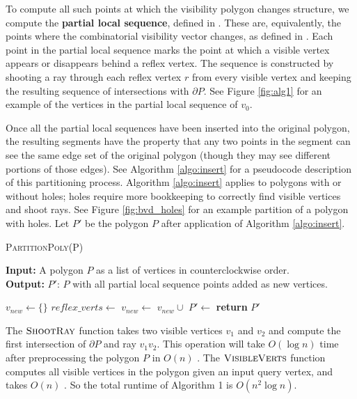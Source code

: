 \documentclass[sageh,times,Review]{sagej}
\begin{document}
To compute all such points at which the visibility polygon changes structure, we
 compute the \textbf{partial local sequence}, defined in \cite{rourke_viz}.
These are, equivalently, the points where the combinatorial visibility vector
changes, as defined in \cite{suri2008simple}.
Each point in the partial local sequence marks the point
at which a visible vertex appears or disappears behind a reflex vertex. 
The sequence is constructed by shooting a ray through each reflex vertex $r$ from every
visible vertex and keeping the resulting sequence of intersections with
$\partial P$. See Figure \ref{fig:alg1} for an
example of the vertices in the partial local sequence of $v_0$. 

Once all the partial local sequences have been inserted into the original
polygon, the resulting segments have the property that 
any two points in the segment can see the same edge set of the
original polygon (though they may see different portions of those edges).
See Algorithm \ref{algo:insert} for a pseudocode
description of this partitioning process. Algorithm
\ref{algo:insert} applies to polygons with or without holes; holes 
require more bookkeeping to correctly find visible vertices and shoot
rays. See Figure \ref{fig:bvd_holes} for an example partition of a polygon with
 holes. Let $P'$ be the polygon $P$ after application of Algorithm
\ref{algo:insert}.

\begin{algorithm}
\caption{\textsc{PartitionPoly}(P)}
\label{algo:insert}
\hspace*{\algorithmicindent} \textbf{Input:} A polygon $P$ as a list of
vertices in counterclockwise order.\\
\hspace*{\algorithmicindent} \textbf{Output:} $P'$: $P$ with
all partial local sequence points added as new vertices.
\begin{algorithmic}[1]
\State $v_{new} \gets \{\}$
\State $reflex\_verts \gets$ 
        \State $v_{new} \gets$ $v_{new} \cup$ 
    \EndFor
\EndFor
\State $P' \gets$ 
\State \textbf{return} $P'$
\end{algorithmic}
\end{algorithm}

The $\textsc{ShootRay}$ function takes two visible vertices $v_{1}$ and $v_{2}$
and compute the first intersection of $\partial P$ and ray $v_{1}v_{2}$. This
operation will take $O(\log n)$ time after preprocessing the polygon $P$ in
$O(n)$ \cite{Szirmay-Kalos:1998:WVA:297217.297219}. The $\textsc{VisibleVerts}$
function computes all visible vertices in the polygon given an input query
vertex, and takes $O(n)$ \cite{ElGindy1981ALA}. So the total runtime of
Algorithm 1 is $O(n^2\log n)$.
\end{document}
